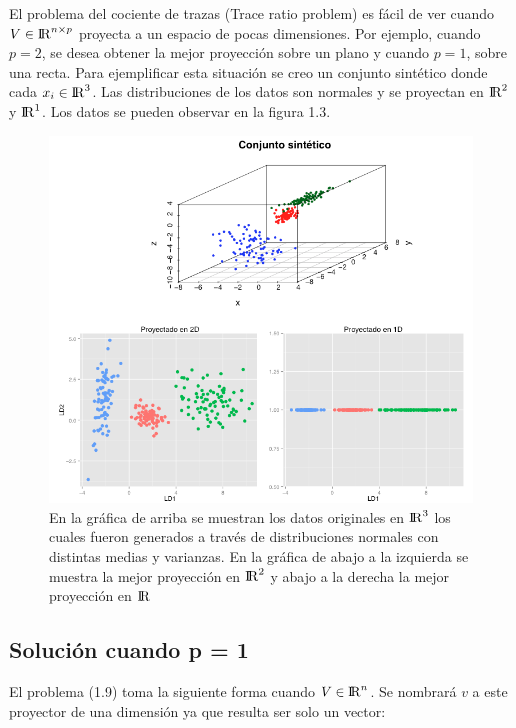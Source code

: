 El problema del cociente de trazas (Trace ratio problem) es fácil de ver cuando $V \in {\rm I\!R}^{n \times p}$ proyecta a un espacio de pocas dimensiones. Por ejemplo, cuando $p = 2$, se desea obtener la mejor proyección sobre un plano y cuando $p = 1$, sobre una recta. Para ejemplificar esta situación se creo un conjunto sintético donde cada $x_i \in {\rm I\!R}^{3}$. Las distribuciones de los datos son normales y se proyectan en ${\rm I\!R}^{2}$ y ${\rm I\!R}^{1}$. Los datos se pueden observar en la figura 1.3.

\begin{figure}[!ht]\label{Fig1.2}
  \centering
  \includegraphics[width=1\textwidth]{Figures/Chapter2_1} 
  \caption[Mejores proyecciones en ${\rm I\!R}^{2}$ y ${\rm I\!R}$.]
  {En la gráfica de arriba se muestran los datos originales en 
   ${\rm I\!R}^{3}$ los cuales fueron generados a través de distribuciones normales con distintas medias y varianzas. En la gráfica de abajo a la izquierda se muestra la mejor proyección en ${\rm I\!R}^{2}$ y abajo a la derecha la mejor proyección en ${\rm I\!R}$}
\end{figure}

\subsection{Solución cuando p = 1}

El problema (1.9) toma la siguiente forma cuando $V \in {\rm I\!R}^{n}$. Se nombrará $v$ a este proyector de una dimensión ya que resulta ser solo un vector:


